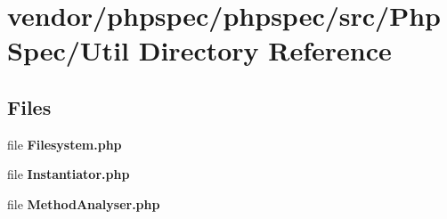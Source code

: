 \section{vendor/phpspec/phpspec/src/\+Php\+Spec/\+Util Directory Reference}
\label{dir_f38962a0a8944f40ae7120767ff0a45b}
\subsection*{Files}
\begin{DoxyCompactItemize}
\item 
file {\bf Filesystem.\+php}
\item 
file {\bf Instantiator.\+php}
\item 
file {\bf Method\+Analyser.\+php}
\end{DoxyCompactItemize}
